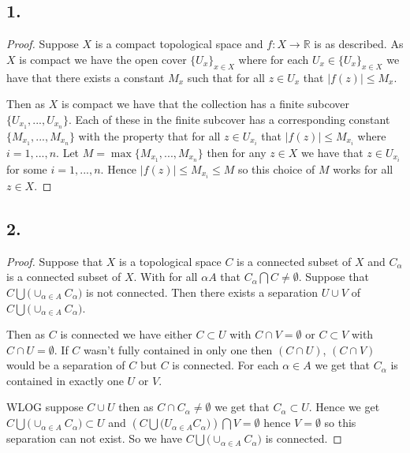 \documentclass{amsart}
\theoremstyle{plain}
\theoremstyle{definition}
\theoremstyle{remark}
\begin{document}
\noindent
\subsection*{1.}

\begin{proof}
    Suppose $X$ is a compact topological space and $f: X\to \mathbb R$ is as described. As $X$ is compact we have the open cover $\{U_x\}_{x\in X}$ where for each $U_x\in \{U_x\}_{x\in X}$ we have that there exists a constant $M_x$ such that for all $z\in U_x$ that $|f(z)|\leq M_x$. 
    
    Then as $X$ is compact we have that the collection has a finite subcover $\{U_{x_1},...,U_{x_n}\}$. Each of these in the finite subcover has a corresponding constant $\{M_{x_1},...,M_{x_n}\}$ with the property that for all $z\in U_{x_i}$ that $|f(z)|\leq M_{x_i}$ where $i=1,...,n$. Let $M=\max\{M_{x_1},...,M_{x_n}\}$ then for any $z\in X$ we have that $z\in U_{x_i}$ for some $i=1,...,n$. Hence $|f(z)|\leq M_{x_i}\leq M$ so this choice of $M$ works for all $z\in X$.
\end{proof}

\subsection*{2.}

\begin{proof}
    Suppose that $X$ is a topological space $C$ is a connected subset of $X$ and $C_{\alpha}$ is a connected subset of $X$. With for all $\alpha A$ that $C_\alpha \bigcap C\not = \emptyset$. Suppose that $C\bigcup \big ( \cup _{\alpha \in A} C_\alpha \big)$ is not connected. Then there exists a separation $U\cup V$ of $C\bigcup \big(\cup _{\alpha \in A} C_\alpha \big)$. 
    
    Then as $C$ is connected we have either $C\subset U$ with $C\cap V=\emptyset$ or $C\subset V$ with $C\cap U=\emptyset$. If $C$ wasn't fully contained in only one then $(C\cap U)$, $(C\cap V)$ would be a separation of $C$ but $C$ is connected. For each $\alpha \in A$ we get that $C_\alpha$ is contained in exactly one $U$ or $V$.
    
    WLOG suppose $C\cup U$ then as $C\cap C_\alpha \not = \emptyset $ we get that $C_\alpha \subset U$. Hence we get $C\bigcup \big(\cup _{\alpha \in A}C_\alpha \big)\subset U$ and $\left(C\bigcup \big(U_{\alpha\in A} C_\alpha \big)\right) \bigcap V=\emptyset$ hence $V=\emptyset$ so this separation can not exist. So we have $C\bigcup \big( \cup _{\alpha \in A}C_\alpha \big)$ is connected. 
\end{proof}
\end{document}
